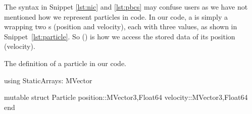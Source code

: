 The syntax in Snippet \ref{lst:nic} and \ref{lst:pbcs} may confuse users as we
have not mentioned how we represent particles in
code. In our code, a  is simply a  wrapping two
s (position and velocity), each with three  values, as shown in
Snippet~\ref{lst:particle}. So  () is how we access the
stored data of its position (velocity).

\begin{algorithm}
    \caption{The definition of a particle in our code.}
    \label{lst:particle}
    \begin{juliacode}
        using StaticArrays: MVector

        mutable struct Particle
            position::MVector{3,Float64}
            velocity::MVector{3,Float64}
        end
    \end{juliacode}
\end{algorithm}

